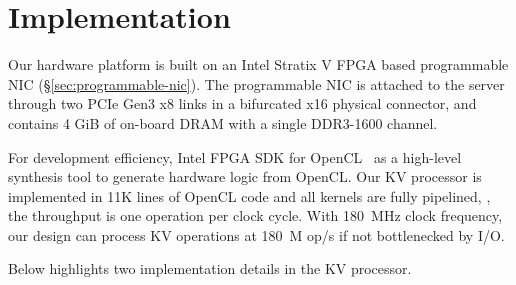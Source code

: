 \section{Implementation}
\label{sec:implementation}

Our hardware platform is built on an Intel Stratix V FPGA based programmable NIC (\S\ref{sec:programmable-nic}).
The programmable NIC is attached to the server through two PCIe Gen3 x8 links in a bifurcated x16 physical connector, and contains 4 GiB of on-board DRAM with a single DDR3-1600 channel.

For development efficiency, Intel FPGA SDK for OpenCL~\cite{aoc} as a high-level synthesis tool to generate hardware logic from OpenCL.
Our KV processor is implemented in 11K lines of OpenCL code and all kernels are fully pipelined, \ie, the throughput is one operation per clock cycle.
With 180~MHz clock frequency, our design can process KV operations at 180~M op/s if not bottlenecked by I/O.

%


Below highlights two implementation details in the KV processor.


